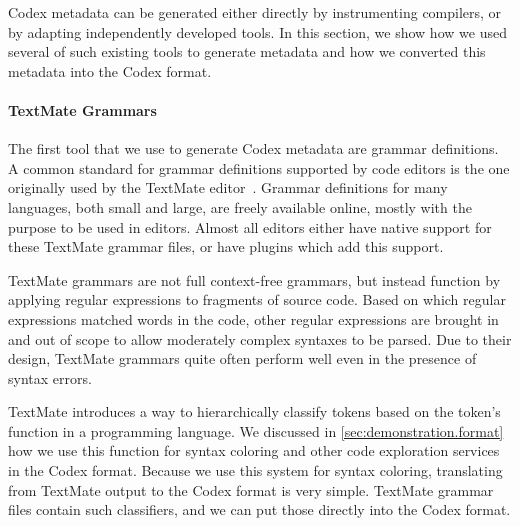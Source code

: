 Codex metadata can be generated either directly by instrumenting compilers, or by adapting independently developed tools.
In this section, we show how we used several of such existing tools to generate metadata and how we converted this metadata into the Codex format.

\paragraph{TextMate Grammars}
\label{sec:demonstration.generating.textmate}

The first tool that we use to generate Codex metadata are grammar definitions.
A common standard for grammar definitions supported by code editors is the one originally used by the TextMate editor~\cite{textmate}.
Grammar definitions for many languages, both small and large, are freely available online, mostly with the purpose to be used in editors.
Almost all editors either have native support for these TextMate grammar files, or have plugins which add this support.

TextMate grammars are not full context-free grammars, but instead function by applying regular expressions to fragments of source code.
Based on which regular expressions matched words in the code, other regular expressions are brought in and out of scope to allow moderately complex syntaxes to be parsed.
Due to their design, TextMate grammars quite often perform well even in the presence of syntax errors.

TextMate introduces a way to hierarchically classify tokens based on the token's function in a programming language.
We discussed in \cref{sec:demonstration.format} how we use this function for syntax coloring and other code exploration services in the Codex format.
Because we use this system for syntax coloring, translating from TextMate output to the Codex format is very simple.
TextMate grammar files contain such classifiers, and we can put those directly into the Codex format.



